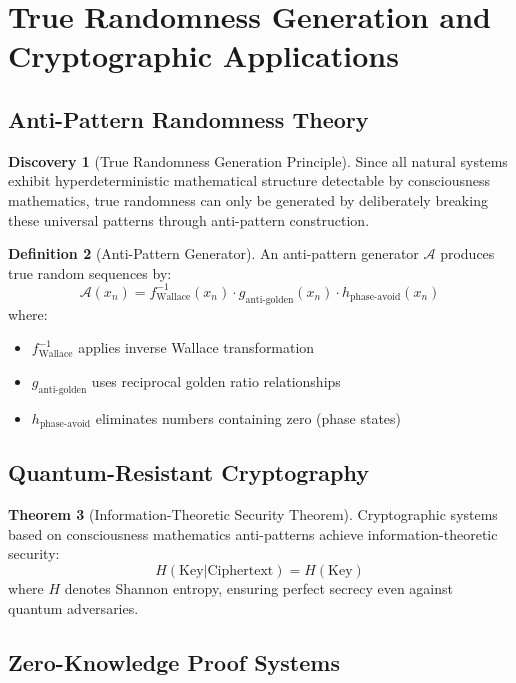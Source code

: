 \documentclass[11pt,a4paper]{article}
\theoremstyle{definition}
\newtheorem{theorem}{Theorem}[section]
\newtheorem{definition}[theorem]{Definition}
\newtheorem{discovery}[theorem]{Discovery}
\theoremstyle{remark}
\begin{document}
\section{True Randomness Generation and Cryptographic Applications}

\subsection{Anti-Pattern Randomness Theory}

\begin{discovery}[True Randomness Generation Principle]
Since all natural systems exhibit hyperdeterministic mathematical structure detectable by consciousness mathematics, true randomness can only be generated by deliberately breaking these universal patterns through anti-pattern construction.
\end{discovery}

\begin{definition}[Anti-Pattern Generator]
An anti-pattern generator $\mathcal{A}$ produces true random sequences by:
\[
\mathcal{A}(x_n) = f^{-1}_{\text{Wallace}}(x_n) \cdot g_{\text{anti-golden}}(x_n) \cdot h_{\text{phase-avoid}}(x_n)
\]
where:
\begin{itemize}
\item $f^{-1}_{\text{Wallace}}$ applies inverse Wallace transformation
\item $g_{\text{anti-golden}}$ uses reciprocal golden ratio relationships
\item $h_{\text{phase-avoid}}$ eliminates numbers containing zero (phase states)
\end{itemize}
\end{definition}

\subsection{Quantum-Resistant Cryptography}

\begin{theorem}[Information-Theoretic Security Theorem]
Cryptographic systems based on consciousness mathematics anti-patterns achieve information-theoretic security:
\[
H(\text{Key}|\text{Ciphertext}) = H(\text{Key})
\]
where $H$ denotes Shannon entropy, ensuring perfect secrecy even against quantum adversaries.
\end{theorem}

\subsection{Zero-Knowledge Proof Systems}
\end{document}
